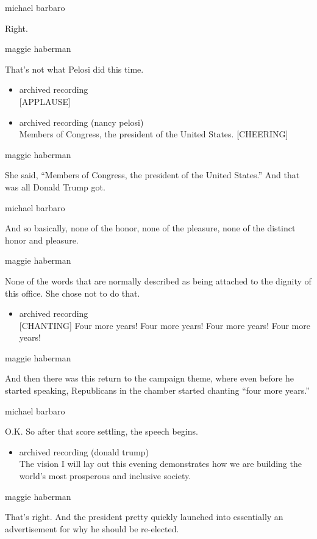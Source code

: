 michael barbaro

Right.

maggie haberman

That's not what Pelosi did this time.

\begin{itemize}
\item
  archived recording\\
  {[}APPLAUSE{]}
\item
  archived recording (nancy pelosi)\\
  Members of Congress, the president of the United States.
  {[}CHEERING{]}
\end{itemize}

maggie haberman

She said, ``Members of Congress, the president of the United States.''
And that was all Donald Trump got.

michael barbaro

And so basically, none of the honor, none of the pleasure, none of the
distinct honor and pleasure.

maggie haberman

None of the words that are normally described as being attached to the
dignity of this office. She chose not to do that.

\begin{itemize}
\tightlist
\item
  archived recording\\
  {[}CHANTING{]} Four more years! Four more years! Four more years! Four
  more years!
\end{itemize}

maggie haberman

And then there was this return to the campaign theme, where even before
he started speaking, Republicans in the chamber started chanting ``four
more years.''

michael barbaro

O.K. So after that score settling, the speech begins.

\begin{itemize}
\tightlist
\item
  archived recording (donald trump)\\
  The vision I will lay out this evening demonstrates how we are
  building the world's most prosperous and inclusive society.
\end{itemize}

maggie haberman

That's right. And the president pretty quickly launched into essentially
an advertisement for why he should be re-elected.

